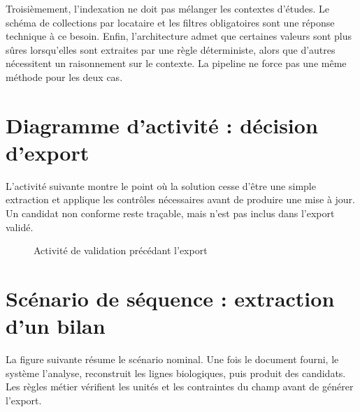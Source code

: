 Troisièmement, l'indexation ne doit pas mélanger les contextes d'études. Le schéma de collections par locataire et les filtres obligatoires sont une réponse technique à ce besoin. Enfin, l'architecture admet que certaines valeurs sont plus sûres lorsqu'elles sont extraites par une règle déterministe, alors que d'autres nécessitent un raisonnement sur le contexte. La pipeline ne force pas une même méthode pour les deux cas.

\section{Diagramme d'activité : décision d'export}
L'activité suivante montre le point où la solution cesse d'être une simple extraction et applique les contrôles nécessaires avant de produire une mise à jour. Un candidat non conforme reste traçable, mais n'est pas inclus dans l'export validé.

\begin{figure}[H]
\centering
{}
\caption{Activité de validation précédant l'export}
\end{figure}

\section{Scénario de séquence : extraction d'un bilan}
La figure suivante résume le scénario nominal. Une fois le document fourni, le système l'analyse, reconstruit les lignes biologiques, puis produit des candidats. Les règles métier vérifient les unités et les contraintes du champ avant de générer l'export.

